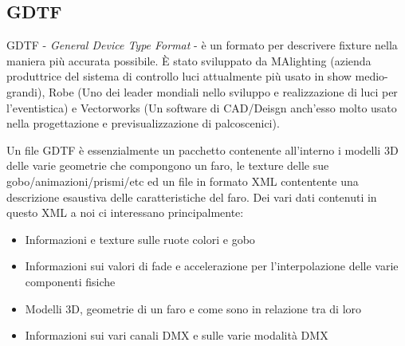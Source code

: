 \documentclass[main.tex]{subfiles}
\begin{document}
\subsection{GDTF}\label{subsec:1_gdtf}
GDTF - \textit{General Device Type Format} - è un formato per descrivere fixture nella maniera più accurata possibile. È stato sviluppato da MAlighting (azienda produttrice del sistema di controllo luci attualmente più usato in show medio-grandi), Robe (Uno dei leader mondiali nello sviluppo e realizzazione di luci per l'eventistica) e Vectorworks (Un software di CAD/Deisgn anch'esso molto usato nella progettazione e previsualizzazione di palcoscenici). 
\newline

Un file GDTF è essenzialmente un pacchetto contenente all'interno i modelli 3D delle varie geometrie che compongono un faro, le texture delle sue gobo/animazioni/prismi/etc ed un file in formato XML contentente una descrizione esaustiva delle caratteristiche del faro. \newline
Dei vari dati contenuti in questo XML a noi ci interessano principalmente:
\begin{itemize}
    \item Informazioni e texture sulle ruote colori e gobo
    \item Informazioni sui valori di fade e accelerazione per l'interpolazione delle varie componenti fisiche
    \item Modelli 3D, geometrie di un faro e come sono in relazione tra di loro
    \item Informazioni sui vari canali DMX e sulle varie modalità DMX
\end{itemize}
\end{document}
